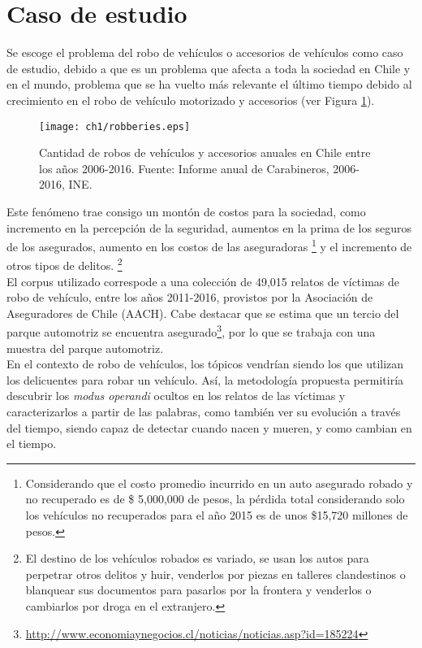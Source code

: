 \section{Caso de estudio}

Se escoge el problema del robo de vehículos o accesorios de vehículos como caso de estudio, debido a que es un problema que afecta a toda la sociedad en Chile y en el mundo, problema que se ha vuelto más relevante el último tiempo debido al crecimiento en el robo de vehículo motorizado y accesorios (ver Figura \ref{fig:antecedente}).\\ 

\begin{figure}
    \texttt{[image: ch1/robberies.eps]} 
    \caption{Cantidad de robos de vehículos y accesorios anuales en Chile entre los años 2006-2016. Fuente: Informe anual de Carabineros, 2006-2016, INE.} 
    \label{fig:antecedente}
\end{figure}

Este fenómeno trae consigo un montón de costos para la sociedad, como incremento en la percepción de la seguridad, aumentos en la prima de los seguros de los asegurados, aumento en los costos de las aseguradoras \footnote{Considerando que el costo promedio incurrido en un auto asegurado robado y no recuperado es de \$ 5,000,000 de pesos, la pérdida total considerando solo los vehículos no recuperados para el año 2015 es de unos \$15,720 millones de pesos.} y el incremento de otros tipos de delitos. \footnote{El destino de los vehículos robados es variado, se usan los autos para perpetrar otros delitos y huir, venderlos por piezas en talleres clandestinos o blanquear sus documentos para pasarlos por la frontera y venderlos o cambiarlos por droga en el extranjero.}\\

El corpus utilizado correspode a una colección de 49,015 relatos de víctimas de robo de vehículo, entre los años 2011-2016, provistos por la Asociación de Aseguradores de Chile (AACH). Cabe destacar que se estima que un tercio del parque automotriz se encuentra asegurado\footnote{\href{http://www.economiaynegocios.cl/noticias/noticias.asp?id=185224}{http://www.economiaynegocios.cl/noticias/noticias.asp?id=185224}}, por lo que se trabaja con una muestra del parque automotriz.\\

En el contexto de robo de vehículos, los tópicos vendrían siendo los  que utilizan los delicuentes para robar un vehículo. Así, la metodología propuesta permitiría descubrir los \textit{modus operandi} ocultos en los relatos de las víctimas y caracterizarlos a partir de las palabras, como también ver su evolución a través del tiempo, siendo capaz de detectar cuando nacen y mueren, y como cambian en el tiempo.\\

